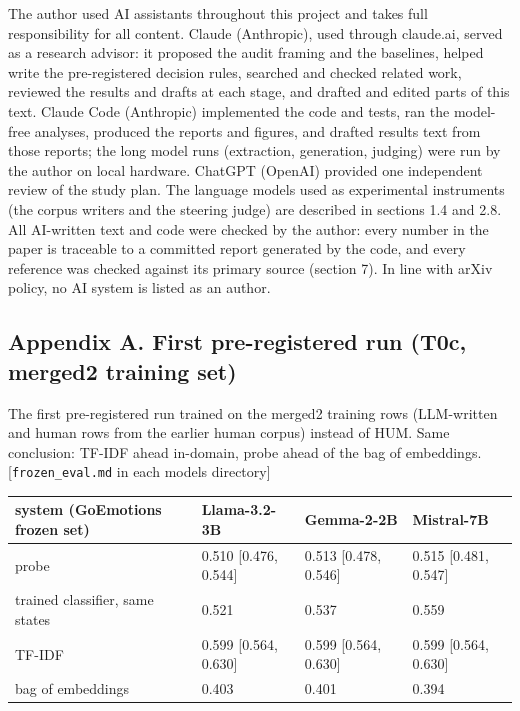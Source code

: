 \documentclass[
  10pt,
]{article}
\newcounter{none} %
\begin{document}
The author used AI assistants throughout this project and takes full
responsibility for all content. Claude (Anthropic), used through
claude.ai, served as a research advisor: it proposed the audit framing
and the baselines, helped write the pre-registered decision rules,
searched and checked related work, reviewed the results and drafts at
each stage, and drafted and edited parts of this text. Claude Code
(Anthropic) implemented the code and tests, ran the model-free analyses,
produced the reports and figures, and drafted results text from those
reports; the long model runs (extraction, generation, judging) were run
by the author on local hardware. ChatGPT (OpenAI) provided one
independent review of the study plan. The language models used as
experimental instruments (the corpus writers and the steering judge) are
described in sections 1.4 and 2.8. All AI-written text and code were
checked by the author: every number in the paper is traceable to a
committed report generated by the code, and every reference was checked
against its primary source (section 7). In line with arXiv policy, no AI
system is listed as an author.

\subsection{Appendix A. First pre-registered run (T0c, merged2 training
set)}\label{appendix-a-first-pre-registered-run-t0c-merged2-training-set}

The first pre-registered run trained on the merged2 training rows
(LLM-written and human rows from the earlier human corpus) instead of
HUM. Same conclusion: TF-IDF ahead in-domain, probe ahead of the bag of
embeddings. {[}\texttt{frozen\_eval.md} in each model\textquotesingle s
directory{]}

{\def\LTcaptype{none} %
\begin{longtable}[]{@{}llll@{}}
\toprule\noalign{}
system (GoEmotions frozen set) & Llama-3.2-3B & Gemma-2-2B &
Mistral-7B \\
\midrule\noalign{}
\endhead
\bottomrule\noalign{}
\endlastfoot
probe & 0.510 {[}0.476, 0.544{]} & 0.513 {[}0.478, 0.546{]} & 0.515
{[}0.481, 0.547{]} \\
trained classifier, same states & 0.521 & 0.537 & 0.559 \\
TF-IDF & 0.599 {[}0.564, 0.630{]} & 0.599 {[}0.564, 0.630{]} & 0.599
{[}0.564, 0.630{]} \\
bag of embeddings & 0.403 & 0.401 & 0.394 \\
\end{longtable}
}
\end{document}
